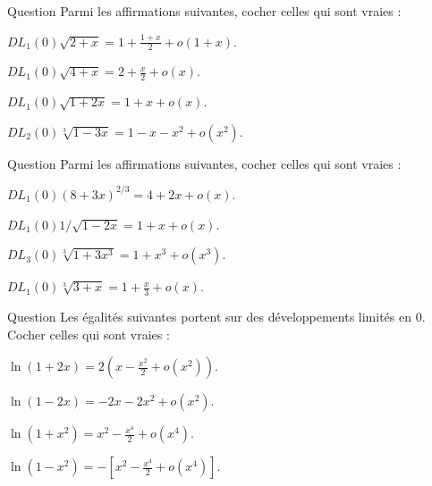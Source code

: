 \begin{multi}[multiple,feedback=
{D'abord, \(\displaystyle \sqrt{2+x}=\sqrt{2}\times \sqrt{1+\frac{x}{2}}\) et \(\displaystyle \sqrt{4+x}=\sqrt{4}\times \sqrt{1+\frac{x}{4}}\). Ensuite, on applique le développement \(\displaystyle DL_1(0)\sqrt{1+t}=1+\frac{t}{2}+o(t)\) avec \(\displaystyle t=\frac{x}{2}\), \(\displaystyle t=\frac{x}{4}\) et \(t=2x\). Enfin, on applique le développement \(\displaystyle DL_2(0)(1+t)^{\alpha}\) avec \(\displaystyle \alpha =\frac{1}{3}\) et \(t=-3x\).
}]{Question}
Parmi les affirmations suivantes, cocher celles qui sont vraies :

    \item \(\displaystyle DL_1(0)\sqrt{2+x}=1+\frac{1+x}{2}+o(1+x)\).
    \item \(\displaystyle DL_1(0)\sqrt{4+x}=2+\frac{x}{2}+o(x)\).
    \item* \(\displaystyle DL_1(0)\sqrt{1+2x}=1+x+o(x)\).
    \item* \(\displaystyle DL_2(0)\sqrt[3]{1-3x}=1-x-x^2+o(x^2)\).
\end{multi}


\begin{multi}{Question}
Parmi les affirmations suivantes, cocher celles qui sont vraies :

    \item \(\displaystyle DL_1(0)(8+3x)^{2/3}=4+2x+o(x)\).
    \item* \(\displaystyle DL_1(0)1/\sqrt{1-2x}=1+x+o(x)\).
    \item* \(\displaystyle DL_3(0)\sqrt[3]{1+3x^3}=1+x^3+o(x^3)\).
    \item \(\displaystyle DL_1(0)\sqrt[3]{3+x}=1+\frac{x}{3}+o(x)\).
\end{multi}


\begin{multi}[multiple,feedback=
{On applique le développement : \(\displaystyle DL_2(0)\ln(1+t)=t-\frac{t^2}{2}+o(t^2)\) avec \(t=2x\), \(t=-2x\), \(t=x^2\) et enfin avec \(t=-x^2\).
}]{Question}
Les égalités suivantes portent sur des développements limités en \(0\). Cocher celles qui sont vraies :

    \item \(\displaystyle \ln(1+2x)=2\left(x-\frac{x^2}{2}+o(x^2)\right)\).
    \item* \(\displaystyle \ln(1-2x)=-2x-2x^2+o(x^2)\).
    \item* \(\displaystyle \ln(1+x^2)=x^2-\frac{x^4}{2}+o(x^4)\).
    \item \(\displaystyle \ln(1-x^2)=-\left[x^2-\frac{x^4}{2}+o(x^4)\right]\).
\end{multi}


